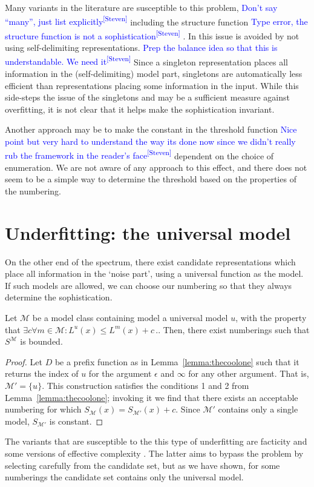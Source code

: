 \documentclass{style/llncs}
\newcommand{\M}{\mathscr M}
\newcommand{\s}{S}
\newcommand{\p}{\,\text{.}}
\newcommand{\sdr}[1]{\textcolor{blue}{\small #1\textsuperscript{[Steven]} }}
\begin{document}
Many variants in the literature are susceptible to this problem, \sdr{Don't say ``many'', just list explicitly} including the structure function \sdr{Type error, the structure function is not a sophistication} \cite{cover1985kolmogorov,gacs2001algorithmic}. In \cite{vitanyi2004meaningful,adriaans2012facticity} this issue is avoided by not using self-delimiting representations. \sdr{Prep the balance idea so that this is understandable. We need it} Since a singleton representation places all information in the (self-delimiting) model part, singletons are automatically less efficient than representations placing some information in the input. While this side-steps the issue of the singletons and may be a sufficient measure against overfitting, it is not clear that it helps make the sophistication invariant.

Another approach may be to make the constant in the threshold function \sdr{Nice point but very hard to understand the way its done now since we didn't really rub the framework in the reader's face} dependent on the choice of enumeration. We are not aware of any approach to this effect, and there does not seem to be a simple way to determine the threshold based on the properties of the numbering.

\section{Underfitting: the universal model}
\label{section:underfitting}
On the other end of the spectrum, there exist candidate representations which place all information in the `noise part', using a universal function as the model. If such models are allowed, we can choose our numbering so that they always determine the sophistication.

\begin{lemma}[Underfitting]
Let $\M$ be a model class containing model a universal model $u$, with the property that $\exists c \forall m \in \M : L^u(x) \leq L^m(x) + c \p$. Then, there exist numberings such that $\s^\M$ is bounded.
\end{lemma}
\begin{proof}
Let $D$ be a prefix function as in Lemma~\ref{lemma:thecoolone} such that it returns the index of $u$ for the argument $\epsilon$ and $\infty$ for any other argument. That is, $\M' = \{u\}$. This construction satisfies the conditions 1 and 2 from Lemma~\ref{lemma:thecoolone}; invoking it we find that there exists an acceptable numbering for which $\s_\M(x) = \s_{\M'}(x) + c$. Since $\M'$ contains only a single model, $\s_{\M'}$ is constant.
\end{proof}
The variants that are susceptible to the this type of underfitting are facticity \cite{adriaans2012facticity} and some versions of effective complexity \cite{gellmann1996information}. The latter aims to bypass the problem by selecting carefully from the candidate set, but as we have shown, for some numberings the candidate set contains only the universal model.
\end{document}
